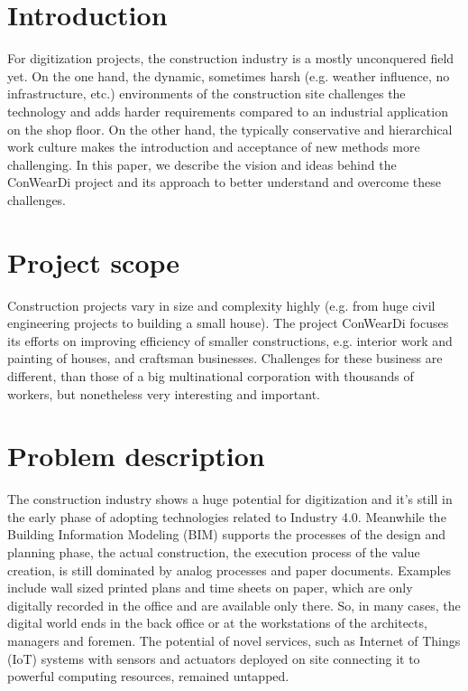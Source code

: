 \section{Introduction}
For digitization projects, the construction industry is a mostly unconquered field yet.
On the one hand, the dynamic, sometimes harsh (e.g. weather influence, no infrastructure, etc.) environments of the construction site challenges the technology and adds harder requirements compared to an industrial application on the shop floor. 
On the other hand, the typically conservative and hierarchical work culture makes the introduction and acceptance of new methods more challenging. 
In this paper, we describe the vision and ideas behind the ConWearDi project and its approach to better understand and overcome these challenges.

\section{Project scope}
Construction projects vary in size and complexity highly (e.g. from huge civil engineering projects to building a small house). 
The project ConWearDi focuses its efforts on improving efficiency of smaller constructions, e.g. interior work and painting of houses, and craftsman businesses.
Challenges for these business are different, than those of a big multinational corporation with thousands of workers, but nonetheless very interesting and important.

\section{Problem description}
The construction industry shows a huge potential for digitization and it's still in the early phase of adopting technologies related to Industry 4.0. 
Meanwhile the Building Information Modeling (BIM) supports the processes of the design and planning phase, the actual construction, the execution process of the value creation, is still dominated by analog processes and paper documents. 
Examples include wall sized printed plans and time sheets on paper, which are only digitally recorded in the office and are available only there. 
So, in many cases, the digital world ends in the back office or at the workstations of the architects, managers and foremen. 
The potential of novel services, such as Internet of Things (IoT) systems with sensors and actuators deployed on site connecting it to powerful computing resources, remained untapped.

